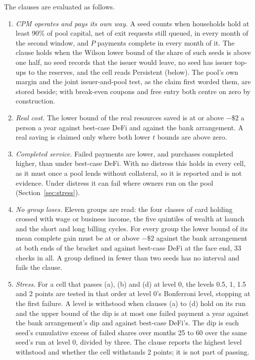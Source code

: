 The clauses are evaluated as follows.
\begin{enumerate}[label=(\alph*), leftmargin=*, itemsep=2pt]
  \item \emph{CPM operates and pays its own way.} A seed counts when households hold at least 90\% of pool capital,
        net of exit requests still queued, in every month of the second window, and $P$ payments complete in every
        month of it. The clause holds when the Wilson lower bound of the share of such seeds is above one half, no
        seed records that the issuer would leave, no seed has issuer top-ups to the reserves, and the cell reads
        Persistent (below). The pool's own margin and the joint issuer-and-pool test, as the claim first worded them,
        are stored beside; with break-even coupons and free entry both centre on zero by construction.
  \item \emph{Real cost.} The lower bound of the real resources saved is at or above $-\$2$ a person a year against
        best-case DeFi and against the bank arrangement. A real saving is claimed only where both lower $t$ bounds
        are above zero.
  \item \emph{Completed service.} Failed payments are lower, and purchases completed higher, than under best-case
        DeFi. With no distress this holds in every cell, as it must once a pool lends without collateral, so it
        is reported and is not evidence. Under distress it can fail where owners run on the pool
        (Section~\ref{sec:stress}).
  \item \emph{No group loses.} Eleven groups are read: the four classes of card holding crossed with wage or
        business income, the five quintiles of wealth at launch and the short and long billing cycles. For every
        group the lower bound of its mean complete gain must be at or above $-\$2$ against the bank arrangement at
        both ends of the bracket and against best-case DeFi at the face end, 33 checks in all. A group defined in
        fewer than two seeds has no interval and fails the clause.
  \item \emph{Stress.} For a cell that passes (a), (b) and (d) at level 0, the levels 0.5, 1, 1.5 and 2 points are
        tested in that order at level 0's Bonferroni level, stopping at the first failure. A level is withstood when
        clauses (a) to (d) hold on its run and the upper bound of the dip is at most one failed payment a year
        against the bank arrangement's dip and against best-case DeFi's. The dip is each seed's cumulative excess of
        failed shares over months 25 to 60 over the same seed's run at level 0, divided by three. The clause reports
        the highest level withstood and whether the cell withstands 2 points; it is not part of passing.
\end{enumerate}

